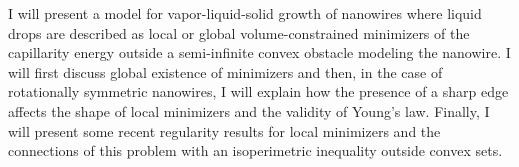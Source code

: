 \mypage
{}
\begin{myabstract}
I will present a model for vapor-liquid-solid growth of nanowires where liquid drops are described as local or global volume-constrained minimizers of the capillarity energy outside a semi-infinite convex obstacle modeling the nanowire. I will first discuss global existence of minimizers and then, in the case of rotationally symmetric nanowires, I will explain how the presence of a sharp edge affects the shape of local minimizers and the validity of Young's law. Finally, I will present some recent regularity results for local minimizers and the connections of this problem with an isoperimetric inequality outside convex sets.
\end{myabstract}
